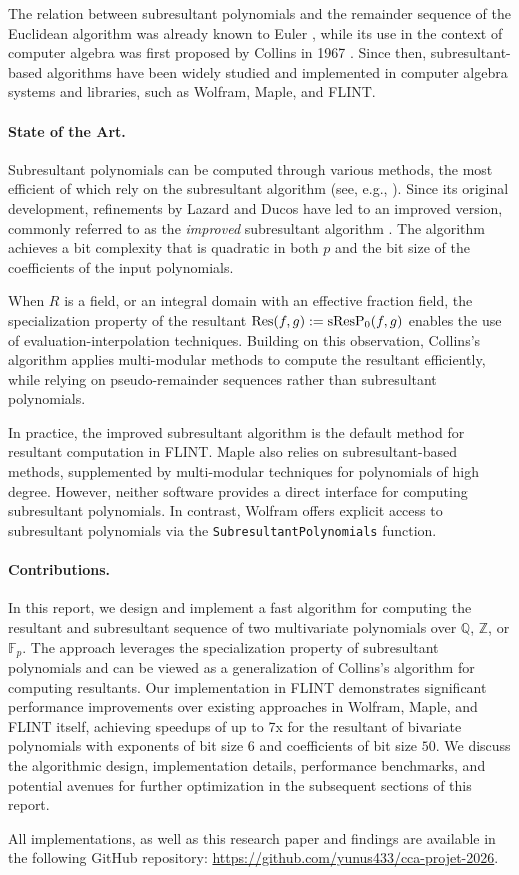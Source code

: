 The relation between subresultant polynomials and the remainder sequence of the Euclidean algorithm was already known to Euler \cite{euler1750demonstration}, while its use in the context of computer algebra was first proposed by Collins in 1967 \cite{collins1967subresultants}. Since then, subresultant-based algorithms have been widely studied and implemented in computer algebra systems and libraries, such as Wolfram, Maple, and FLINT.

\paragraph{State of the Art.}

Subresultant polynomials can be computed through various methods, the most efficient of which rely on the subresultant algorithm (see, e.g., \cite{akritas1989elements,cohen2013course,geddes1992algorithms}). Since its original development, refinements by Lazard and Ducos have led to an improved version, commonly referred to as the \emph{improved} subresultant algorithm \cite{ducos2000optimizations}. The algorithm achieves a bit complexity that is quadratic in both $p$ and the bit size of the coefficients of the input polynomials.

When $R$ is a field, or an integral domain with an effective fraction field, the specialization property of the resultant $\operatorname{Res}(f,g):=\operatorname{sResP}_0(f,g)$ enables the use of evaluation-interpolation techniques. Building on this observation, Collins's algorithm \cite{collins1971calculation} applies multi-modular methods to compute the resultant efficiently, while relying on pseudo-remainder sequences rather than subresultant polynomials.

In practice, the improved subresultant algorithm is the default method for resultant computation in FLINT. Maple also relies on subresultant-based methods, supplemented by multi-modular techniques for polynomials of high degree. However, neither software provides a direct interface for computing subresultant polynomials. In contrast, Wolfram offers explicit access to subresultant polynomials via the \texttt{SubresultantPolynomials} function.

\paragraph{Contributions.}

In this report, we design and implement a fast algorithm for computing the resultant and subresultant sequence of two multivariate polynomials over $\mathbb{Q}$, $\mathbb{Z}$, or $\mathbb{F}_p$. The approach leverages the specialization property of subresultant polynomials and can be viewed as a generalization of Collins’s algorithm for computing resultants.
Our implementation in FLINT demonstrates significant performance improvements over existing approaches in Wolfram, Maple, and FLINT itself, achieving speedups of up to 7x for the resultant of bivariate polynomials with exponents of bit size $6$ and coefficients of bit size $50$. We discuss the algorithmic design, implementation details, performance benchmarks, and potential avenues for further optimization in the subsequent sections of this report.

All implementations, as well as this research paper and findings are available in the following GitHub repository: \url{https://github.com/yunus433/cca-projet-2026}.